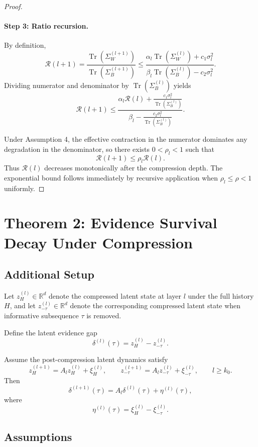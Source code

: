 \documentclass[11pt]{article}
\newcommand{\R}{\mathbb{R}}
\newcommand{\tr}{\operatorname{Tr}}
\begin{document}
\begin{proof}
\paragraph{Step 3: Ratio recursion.}
By definition,
\[
\mathcal{R}(l+1)
=
\frac{\tr(\Sigma_W^{(l+1)})}{\tr(\Sigma_B^{(l+1)})}
\le
\frac{
\alpha_l \tr(\Sigma_W^{(l)}) + c_1 \sigma_l^2
}{
\beta_l \tr(\Sigma_B^{(l)}) - c_2 \sigma_l^2
}.
\]
Dividing numerator and denominator by $\tr(\Sigma_B^{(l)})$ yields
\[
\mathcal{R}(l+1)
\le
\frac{
\alpha_l \mathcal{R}(l) + \frac{c_1 \sigma_l^2}{\tr(\Sigma_B^{(l)})}
}{
\beta_l - \frac{c_2 \sigma_l^2}{\tr(\Sigma_B^{(l)})}
}.
\]

Under Assumption 4, the effective contraction in the numerator dominates any degradation in the denominator, so there exists $0<\rho_l<1$ such that
\[
\mathcal{R}(l+1) \le \rho_l \mathcal{R}(l).
\]
Thus $\mathcal{R}(l)$ decreases monotonically after the compression depth. The exponential bound follows immediately by recursive application when $\rho_l \le \rho < 1$ uniformly.
\end{proof}

\section{Theorem 2: Evidence Survival Decay Under Compression}

\subsection{Additional Setup}

Let $z_H^{(l)} \in \R^d$ denote the compressed latent state at layer $l$ under the full history $H$, and let $z_{-\tau}^{(l)} \in \R^d$ denote the corresponding compressed latent state when informative subsequence $\tau$ is removed.

Define the latent evidence gap
\[
\delta^{(l)}(\tau) = z_H^{(l)} - z_{-\tau}^{(l)}.
\]

Assume the post-compression latent dynamics satisfy
\[
z_H^{(l+1)} = A_l z_H^{(l)} + \xi_H^{(l)},
\qquad
z_{-\tau}^{(l+1)} = A_l z_{-\tau}^{(l)} + \xi_{-\tau}^{(l)},
\qquad l \ge k_0.
\]
Then
\[
\delta^{(l+1)}(\tau)
=
A_l \delta^{(l)}(\tau)
+
\eta^{(l)}(\tau),
\]
where
\[
\eta^{(l)}(\tau)
=
\xi_H^{(l)} - \xi_{-\tau}^{(l)}.
\]

\subsection{Assumptions}
\end{document}
